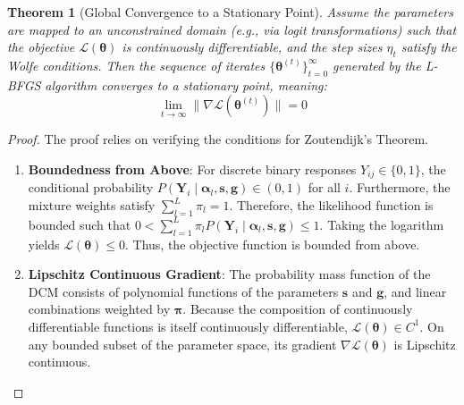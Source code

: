 \documentclass[11pt,a4paper]{article}
\newtheorem{theorem}{Theorem}
\begin{document}
\begin{theorem}[Global Convergence to a Stationary Point]
Assume the parameters are mapped to an unconstrained domain (e.g., 
via logit transformations) such that the objective $\mathcal{L}(\boldsymbol{\theta})$ 
is continuously differentiable, and the step sizes $\eta_t$ satisfy the 
Wolfe conditions. Then the sequence of iterates $\{\boldsymbol{\theta}^{(t)}\}_{t=0}^\infty$ generated by the L-BFGS algorithm converges to a stationary point, meaning:
\begin{equation}
\lim_{t \to \infty} \|\nabla \mathcal{L}(\boldsymbol{\theta}^{(t)})\| = 0
\end{equation}
\end{theorem}

\begin{proof}
The proof relies on verifying the conditions for Zoutendijk's Theorem.

\begin{enumerate}
    \item \textbf{Boundedness from Above}: 
    For discrete binary responses $Y_{ij} \in \{0,1\}$, the conditional 
    probability $P(\mathbf{Y}_i \mid \boldsymbol{\alpha}_l, \mathbf{s}, 
    \mathbf{g}) \in (0,1)$ for all $i$. Furthermore, the mixture weights 
    satisfy $\sum_{l=1}^L \pi_l = 1$. Therefore, the likelihood function 
    is bounded such that $0 < \sum_{l=1}^L \pi_l P(\mathbf{Y}_i \mid \boldsymbol{\alpha}_l, \mathbf{s}, \mathbf{g}) \le 1$. Taking the logarithm yields $\mathcal{L}(\boldsymbol{\theta}) \le 0$. Thus, the objective function is bounded from above.

    \item \textbf{Lipschitz Continuous Gradient}: 
    The probability mass function of the DCM consists of polynomial functions of the parameters $\mathbf{s}$ and $\mathbf{g}$, and linear combinations weighted by $\boldsymbol{\pi}$. Because the composition of continuously differentiable functions is itself continuously differentiable, $\mathcal{L}(\boldsymbol{\theta}) \in C^1$. On any bounded subset of the parameter space, its gradient $\nabla \mathcal{L}(\boldsymbol{\theta})$ is Lipschitz continuous.


\end{enumerate}
\end{proof}
\end{document}
